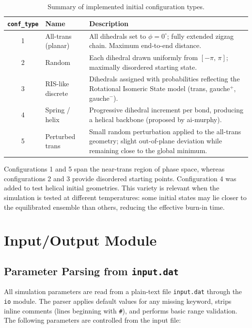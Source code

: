\documentclass[11pt, a4paper]{article}
\begin{document}
\begin{table}[ht]
\centering
\caption{Summary of implemented initial configuration types.}
\label{tab:conf_types}
\begin{tabular}{clp{9cm}}
\toprule
\texttt{conf\_type} & Name & Description \\
\midrule
1 & All-trans (planar) & All dihedrals set to $\phi = 0^\circ$; fully extended
                         zigzag chain. Maximum end-to-end distance. \\
2 & Random & Each dihedral drawn uniformly from $[-\pi,\,\pi]$; maximally
             disordered starting state. \\
3 & RIS-like discrete & Dihedrals assigned with probabilities reflecting the
                        Rotational Isomeric State model (trans, gauche$^+$,
                        gauche$^-$). \\
4 & Spring / helix & Progressive dihedral increment per bond, producing a
                     helical backbone (proposed by ai-murphy). \\
5 & Perturbed trans & Small random perturbation applied to the all-trans
                      geometry; slight out-of-plane deviation while remaining
                      close to the global minimum. \\
\bottomrule
\end{tabular}
\end{table}

Configurations 1 and 5 span the near-trans region of phase space, whereas
configurations 2 and 3 provide disordered starting points. Configuration 4 was
added to test helical initial geometries. This variety is relevant when the
simulation is tested at different temperatures: some initial states may lie
closer to the equilibrated ensemble than others, reducing the effective
burn-in time.

\section{Input/Output Module}
\label{sec:io}

\subsection{Parameter Parsing from \texttt{input.dat}}

All simulation parameters are read from a plain-text file \texttt{input.dat}
through the \texttt{io} module. The parser applies default values for any
missing keyword, strips inline comments (lines beginning with \texttt{\#}),
and performs basic range validation. The following parameters are controlled
from the input file:
\end{document}
